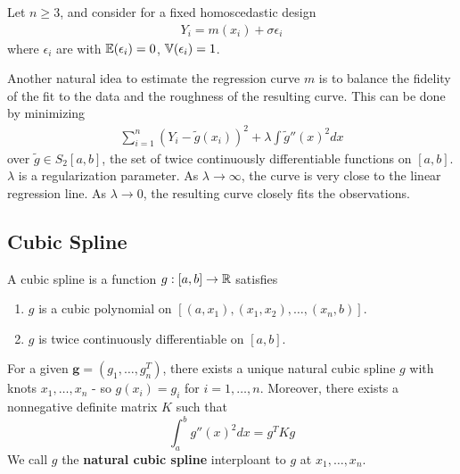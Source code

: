 Let $n \geq 3$, and consider for a fixed homoscedastic design
\begin{align}
  \label{eq:64}
  Y_{i} = m(x_{i}) + \sigma \epsilon_{i}
\end{align} where $\epsilon_{i}$ are \iid with $\E{\epsilon_{i}} = 0$,
$\Var{\epsilon_{i}} = 1$.

Another natural idea to estimate the regression curve $m$ is to
balance the fidelity of the fit to the data and the roughness of the
resulting curve.  This can be done by minimizing
\begin{align}
  \label{eq:65}
  \sum_{i=1}^{n} (Y_{i} - \tilde g(x_{i}))^{2} + \lambda \int \tilde
  g''(x)^{2} dx
\end{align} over $\tilde g \in S_{2}[a, b]$, the set of twice
continuously differentiable functions on $[a, b]$. $\lambda$ is a
regularization parameter. As $\lambda \rightarrow \infty$, the curve
is very close to the linear regression line. As $\lambda \rightarrow
0$, the resulting curve closely fits the observations.

\subsection{Cubic Spline}
\label{sec:cubic-spline}

\begin{defn}
  \label{defn:nonparametric_regression:2}
  A cubic spline is a function $g: [a, b] \rightarrow \mathbb{R}$ satisfies
  \begin{enumerate}
  \item $g$ is a cubic polynomial on $[(a, x_{1}), (x_{1}, x_{2}),
    \dots, (x_{n}, b)]$.
  \item $g$ is twice continuously differentiable on $[a, b]$.
  \end{enumerate}
\end{defn}

\begin{proposition}
  For a given $\mathbf{g} = (g_{1}, \dots, g_{n}^{T})$, there exists a unique
  natural cubic spline $g$ with knots $x_{1}, \dots, x_{n}$ - so
  $g(x_{i}) = g_{i}$ for $i = 1, \dots , n$.  Moreover, there exists a
  nonnegative definite matrix $K$ such that
  \begin{equation}
    \label{eq:59}
    \int_{a}^{b} g''(x)^{2}dx = g^{T}K g
  \end{equation}
  We call $g$ the \textbf{natural cubic spline} interploant to $g$ at
  $x_{1}, \dots, x_{n}$.
\end{proposition}

